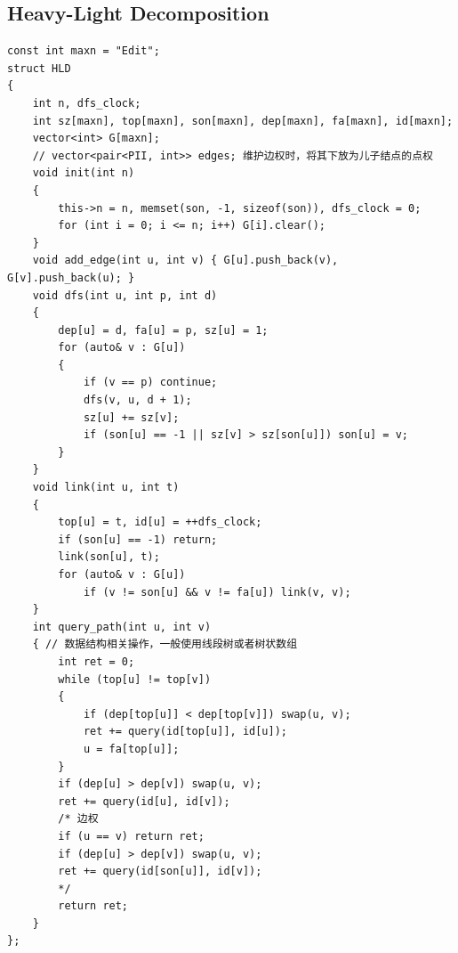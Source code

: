 \documentclass[twoside]{article}
\begin{document}
\subsection{Heavy-Light Decomposition}
\begin{lstlisting}
const int maxn = "Edit";
struct HLD
{
    int n, dfs_clock;
    int sz[maxn], top[maxn], son[maxn], dep[maxn], fa[maxn], id[maxn];
    vector<int> G[maxn];
    // vector<pair<PII, int>> edges; 维护边权时，将其下放为儿子结点的点权
    void init(int n)
    {
        this->n = n, memset(son, -1, sizeof(son)), dfs_clock = 0;
        for (int i = 0; i <= n; i++) G[i].clear();
    }
    void add_edge(int u, int v) { G[u].push_back(v), G[v].push_back(u); }
    void dfs(int u, int p, int d)
    {
        dep[u] = d, fa[u] = p, sz[u] = 1;
        for (auto& v : G[u])
        {
            if (v == p) continue;
            dfs(v, u, d + 1);
            sz[u] += sz[v];
            if (son[u] == -1 || sz[v] > sz[son[u]]) son[u] = v;
        }
    }
    void link(int u, int t)
    {
        top[u] = t, id[u] = ++dfs_clock;
        if (son[u] == -1) return;
        link(son[u], t);
        for (auto& v : G[u])
            if (v != son[u] && v != fa[u]) link(v, v);
    }
    int query_path(int u, int v)
    { // 数据结构相关操作，一般使用线段树或者树状数组
        int ret = 0;
        while (top[u] != top[v])
        {
            if (dep[top[u]] < dep[top[v]]) swap(u, v);
            ret += query(id[top[u]], id[u]);
            u = fa[top[u]];
        }
        if (dep[u] > dep[v]) swap(u, v);
        ret += query(id[u], id[v]);
        /* 边权
        if (u == v) return ret;
        if (dep[u] > dep[v]) swap(u, v);
        ret += query(id[son[u]], id[v]);
        */
        return ret;
    }
};
\end{lstlisting}
\end{document}
